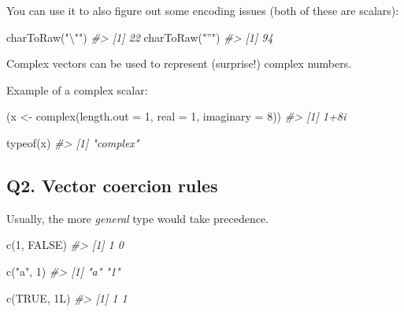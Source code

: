 \documentclass[
]{book}
\newenvironment{Shaded}{\begin{snugshade}}{\end{snugshade}}
\newcommand{\AttributeTok}[1]{\textcolor[rgb]{0.77,0.63,0.00}{#1}}
\newcommand{\CommentTok}[1]{\textcolor[rgb]{0.56,0.35,0.01}{\textit{#1}}}
\newcommand{\ConstantTok}[1]{\textcolor[rgb]{0.00,0.00,0.00}{#1}}
\newcommand{\DecValTok}[1]{\textcolor[rgb]{0.00,0.00,0.81}{#1}}
\newcommand{\FunctionTok}[1]{\textcolor[rgb]{0.00,0.00,0.00}{#1}}
\newcommand{\NormalTok}[1]{#1}
\newcommand{\OtherTok}[1]{\textcolor[rgb]{0.56,0.35,0.01}{#1}}
\newcommand{\SpecialCharTok}[1]{\textcolor[rgb]{0.00,0.00,0.00}{#1}}
\newcommand{\StringTok}[1]{\textcolor[rgb]{0.31,0.60,0.02}{#1}}
\begin{document}
You can use it to also figure out some encoding issues (both of these are scalars):

\begin{Shaded}
\begin{Highlighting}[]
\FunctionTok{charToRaw}\NormalTok{(}\StringTok{"}\SpecialCharTok{\textbackslash{}"}\StringTok{"}\NormalTok{)}
\CommentTok{\#\textgreater{} [1] 22}
\FunctionTok{charToRaw}\NormalTok{(}\StringTok{"”"}\NormalTok{)}
\CommentTok{\#\textgreater{} [1] 94}
\end{Highlighting}
\end{Shaded}

Complex vectors can be used to represent (surprise!) complex numbers.

Example of a complex scalar:

\begin{Shaded}
\begin{Highlighting}[]
\NormalTok{(x }\OtherTok{\textless{}{-}} \FunctionTok{complex}\NormalTok{(}\AttributeTok{length.out =} \DecValTok{1}\NormalTok{, }\AttributeTok{real =} \DecValTok{1}\NormalTok{, }\AttributeTok{imaginary =} \DecValTok{8}\NormalTok{))}
\CommentTok{\#\textgreater{} [1] 1+8i}

\FunctionTok{typeof}\NormalTok{(x)}
\CommentTok{\#\textgreater{} [1] "complex"}
\end{Highlighting}
\end{Shaded}

\hypertarget{q2.-vector-coercion-rules}{%
\subsection*{Q2. Vector coercion rules}\label{q2.-vector-coercion-rules}}

Usually, the more \emph{general} type would take precedence.

\begin{Shaded}
\begin{Highlighting}[]
\FunctionTok{c}\NormalTok{(}\DecValTok{1}\NormalTok{, }\ConstantTok{FALSE}\NormalTok{)}
\CommentTok{\#\textgreater{} [1] 1 0}

\FunctionTok{c}\NormalTok{(}\StringTok{"a"}\NormalTok{, }\DecValTok{1}\NormalTok{)}
\CommentTok{\#\textgreater{} [1] "a" "1"}

\FunctionTok{c}\NormalTok{(}\ConstantTok{TRUE}\NormalTok{, 1L)}
\CommentTok{\#\textgreater{} [1] 1 1}
\end{Highlighting}
\end{Shaded}
\end{document}
